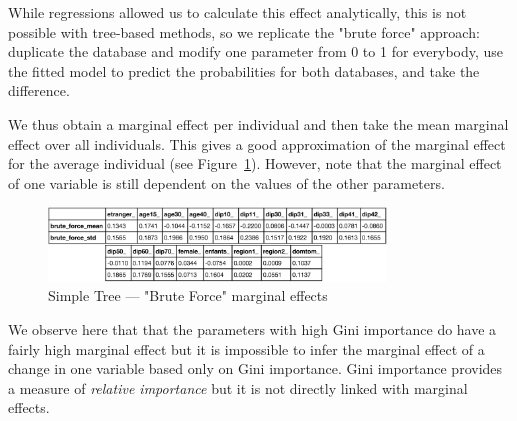 While regressions allowed us to calculate this effect analytically, this is not possible with tree-based methods, so we replicate the "brute force" approach: duplicate the database and modify one parameter from 0 to 1 for everybody, use the fitted model to predict the probabilities for both databases, and take the difference.

We thus obtain a marginal effect per individual and then take the mean marginal effect over all individuals. This gives a good approximation of the marginal effect for the average individual (see Figure~\ref{fig:simple_tree_brute_force}). However, note that the marginal effect of one variable is still dependent on the values of the other parameters.

\begin{figure}
    \centering
    \includegraphics[width=0.8\textwidth]{img/simple_tree_brute_force.png}
    \caption{Simple Tree --- "Brute Force" marginal effects}
    \label{fig:simple_tree_brute_force}
\end{figure}

We observe here that that the parameters with high Gini importance do have a fairly high marginal effect but it is impossible to infer the marginal effect of a change in one variable based only on Gini importance. Gini importance provides a measure of \textit{relative importance} but it is not directly linked with marginal effects.



